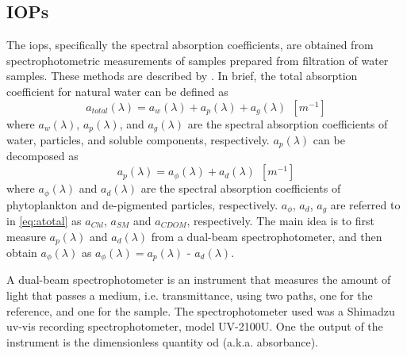\begin{appendices}
\section{IOPs}
The \gls{iops}, specifically the spectral absorption coefficients, are obtained from spectrophotometric measurements of samples prepared from filtration of water samples. These methods are described by \citet{Mitchell2002}. In brief, the total absorption coefficient for natural water can be defined as \citep{Mitchell2002}
\begin{equation}
  a_{total}(\lambda) = a_w(\lambda) + a_p(\lambda) + a_g(\lambda)~~[m^{-1}] 
\end{equation}
\noindent where $a_w(\lambda)$, $a_p(\lambda)$, and $a_g(\lambda)$ are the spectral absorption coefficients of water, particles, and soluble components, respectively. $a_p(\lambda)$ can be decomposed as
\begin{equation}
  a_p(\lambda) = a_\phi(\lambda) + a_d(\lambda)~~[m^{-1}] 
\end{equation}
\noindent where $a_\phi(\lambda)$ and $a_d(\lambda)$ are the spectral absorption coefficients of phytoplankton and de-pigmented particles, respectively. $a_\phi$, $a_d$, $a_g$ are referred to in \autoref{eq:atotal} as $a_{Chl}$, $a_{SM}$ and $a_{CDOM}$, respectively. The main idea is to first measure $a_p(\lambda)$ and $a_d(\lambda)$ from a dual-beam spectrophotometer, and then obtain $a_\phi(\lambda)$ as $a_\phi(\lambda)=a_p(\lambda)$ - $a_d(\lambda)$.

A dual-beam spectrophotometer is an instrument that measures the amount of light that passes a medium, i.e. transmittance, using two paths, one for the reference, and one for the sample. The spectrophotometer used was a Shimadzu \gls{uv}-\gls{vis} recording spectrophotometer, model UV-2100U. One the output of the instrument is the dimensionless quantity \gls{od} (a.k.a. absorbance). 


\end{appendices}
